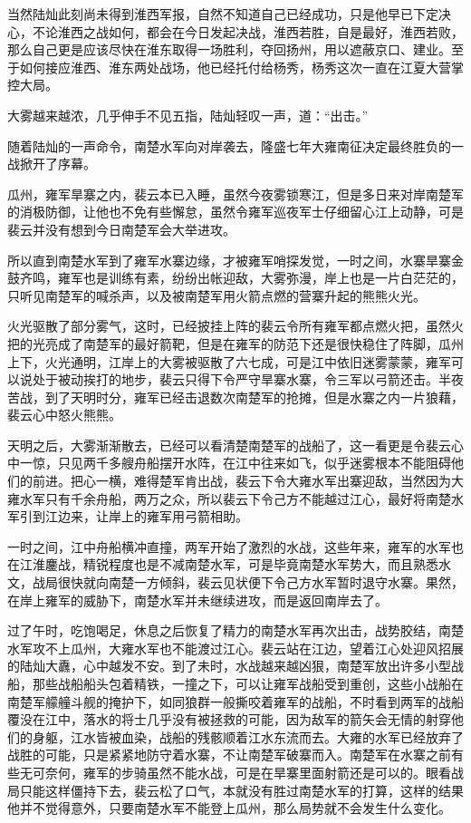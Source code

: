 当然陆灿此刻尚未得到淮西军报，自然不知道自己已经成功，只是他早已下定决心，不论淮西之战如何，都会在今日发起决战，淮西若胜，自是最好，淮西若败，那么自己更是应该尽快在淮东取得一场胜利，夺回扬州，用以遮蔽京口、建业。至于如何接应淮西、淮东两处战场，他已经托付给杨秀，杨秀这次一直在江夏大营掌控大局。

大雾越来越浓，几乎伸手不见五指，陆灿轻叹一声，道：“出击。”

随着陆灿的一声命令，南楚水军向对岸袭去，隆盛七年大雍南征决定最终胜负的一战掀开了序幕。

瓜州，雍军旱寨之内，裴云本已入睡，虽然今夜雾锁寒江，但是多日来对岸南楚军的消极防御，让他也不免有些懈怠，虽然令雍军巡夜军士仔细留心江上动静，可是裴云并没有想到今日南楚军会大举进攻。

所以直到南楚水军到了雍军水寨边缘，才被雍军哨探发觉，一时之间，水寨旱寨金鼓齐鸣，雍军也是训练有素，纷纷出帐迎敌，大雾弥漫，岸上也是一片白茫茫的，只听见南楚军的喊杀声，以及被南楚军用火箭点燃的营寨升起的熊熊火光。

火光驱散了部分雾气，这时，已经披挂上阵的裴云令所有雍军都点燃火把，虽然火把的光亮成了南楚军的最好箭靶，但是在雍军的防范下还是很快稳住了阵脚，瓜州上下，火光通明，江岸上的大雾被驱散了六七成，可是江中依旧迷雾蒙蒙，雍军可以说处于被动挨打的地步，裴云只得下令严守旱寨水寨，令三军以弓箭还击。半夜苦战，到了天明时分，雍军已经击退数次南楚军的抢摊，但是水寨之内一片狼藉，裴云心中怒火熊熊。

天明之后，大雾渐渐散去，已经可以看清楚南楚军的战船了，这一看更是令裴云心中一惊，只见两千多艘舟船摆开水阵，在江中往来如飞，似乎迷雾根本不能阻碍他们的前进。把心一横，难得楚军肯出战，裴云下令大雍水军出寨迎敌，当然因为大雍水军只有千余舟船，两万之众，所以裴云下令己方不能越过江心，最好将南楚水军引到江边来，让岸上的雍军用弓箭相助。

一时之间，江中舟船横冲直撞，两军开始了激烈的水战，这些年来，雍军的水军也在江淮鏖战，精锐程度也是不减南楚水军，可是毕竟南楚水军势大，而且熟悉水文，战局很快就向南楚一方倾斜，裴云见状便下令己方水军暂时退守水寨。果然，在岸上雍军的威胁下，南楚水军并未继续进攻，而是返回南岸去了。

过了午时，吃饱喝足，休息之后恢复了精力的南楚水军再次出击，战势胶结，南楚水军攻不上瓜州，大雍水军也不能渡过江心。裴云站在江边，望着江心处迎风招展的陆灿大纛，心中越发不安。到了未时，水战越来越凶狠，南楚军放出许多小型战船，那些战船船头包着精铁，一撞之下，可以让雍军战船受到重创，这些小战船在南楚军艨艟斗舰的掩护下，如同狼群一般撕咬着雍军的战船，不时看到两军的战船覆没在江中，落水的将士几乎没有被拯救的可能，因为敌军的箭矢会无情的射穿他们的身躯，江水皆被血染，战船的残骸顺着江水东流而去。大雍的水军已经放弃了战胜的可能，只是紧紧地防守着水寨，不让南楚军破寨而入。南楚军在水寨之前有些无可奈何，雍军的步骑虽然不能水战，可是在旱寨里面射箭还是可以的。眼看战局只能这样僵持下去，裴云松了口气，本就没有胜过南楚水军的打算，这样的结果他并不觉得意外，只要南楚水军不能登上瓜州，那么局势就不会发生什么变化。

